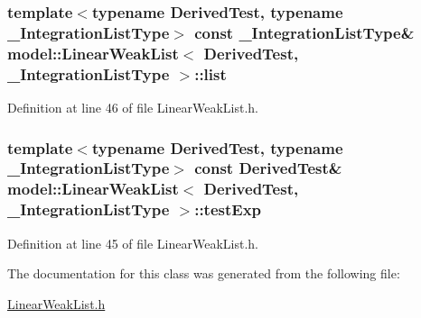 \subsubsection[{list}]{\setlength{\rightskip}{0pt plus 5cm}template$<$typename Derived\+Test, typename \+\_\+\+Integration\+List\+Type$>$ const \+\_\+\+Integration\+List\+Type\& {\bf model\+::\+Linear\+Weak\+List}$<$ Derived\+Test, \+\_\+\+Integration\+List\+Type $>$\+::list}\label{classmodel_1_1_linear_weak_list_a9f0a5bda6e996b30499b54af9f4fd55f}


Definition at line 46 of file Linear\+Weak\+List.\+h.

\hypertarget{classmodel_1_1_linear_weak_list_a1bf96a167a75ffd4f7ffd1793b7a8c63}{}
\subsubsection[{test\+Exp}]{\setlength{\rightskip}{0pt plus 5cm}template$<$typename Derived\+Test, typename \+\_\+\+Integration\+List\+Type$>$ const Derived\+Test\& {\bf model\+::\+Linear\+Weak\+List}$<$ Derived\+Test, \+\_\+\+Integration\+List\+Type $>$\+::test\+Exp}\label{classmodel_1_1_linear_weak_list_a1bf96a167a75ffd4f7ffd1793b7a8c63}


Definition at line 45 of file Linear\+Weak\+List.\+h.



The documentation for this class was generated from the following file\+:\begin{DoxyCompactItemize}
\item 
\hyperlink{_linear_weak_list_8h}{Linear\+Weak\+List.\+h}\end{DoxyCompactItemize}
